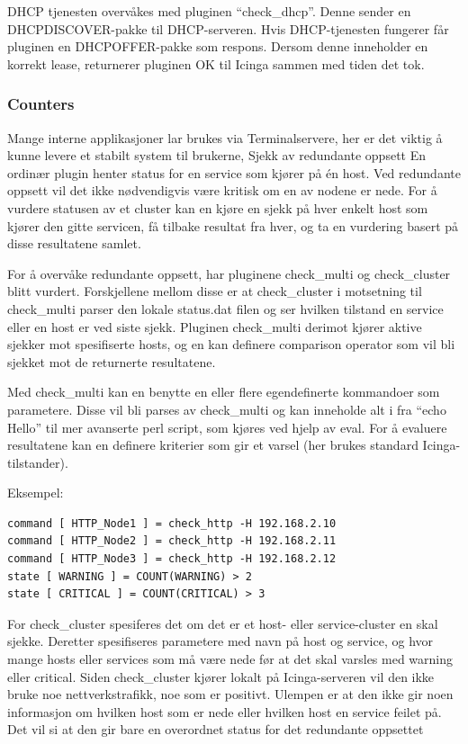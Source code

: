 DHCP tjenesten overvåkes med pluginen “check\_dhcp”. Denne sender en DHCPDISCOVER-pakke til DHCP-serveren. Hvis DHCP-tjenesten fungerer får pluginen en DHCPOFFER-pakke som respons. Dersom denne inneholder en korrekt lease, returnerer pluginen OK til Icinga sammen med tiden det tok.

\subsubsection{Counters}
Mange interne applikasjoner lar brukes via Terminalservere, her er det viktig å kunne levere et stabilt system til brukerne, 
Sjekk av redundante oppsett
En ordinær plugin henter status for en service som kjører på én host. Ved redundante oppsett vil det ikke nødvendigvis være kritisk om en av nodene er nede. For å vurdere statusen av et cluster kan en kjøre en sjekk på hver enkelt host som kjører den gitte servicen, få tilbake resultat fra hver, og ta en vurdering basert på disse resultatene samlet.

For å overvåke redundante oppsett, har pluginene check\_multi og check\_cluster blitt vurdert.  Forskjellene mellom disse er at check\_cluster i motsetning til check\_multi parser den lokale status.dat filen og ser hvilken tilstand en service eller en host er ved siste sjekk. Pluginen check\_multi derimot kjører aktive sjekker mot spesifiserte hosts, og en kan definere comparison operator som vil bli sjekket mot de returnerte resultatene.

Med check\_multi kan en benytte en eller flere egendefinerte kommandoer som parametere. Disse vil bli parses av check\_multi og kan inneholde alt i fra “echo Hello” til mer avanserte perl script, som kjøres ved hjelp av eval. For å evaluere resultatene kan en definere kriterier som gir et varsel (her brukes standard Icinga-tilstander). 

Eksempel:
\begin{lstlisting}
command [ HTTP_Node1 ] = check_http -H 192.168.2.10
command [ HTTP_Node2 ] = check_http -H 192.168.2.11
command [ HTTP_Node3 ] = check_http -H 192.168.2.12
state [ WARNING ] = COUNT(WARNING) > 2
state [ CRITICAL ] = COUNT(CRITICAL) > 3
\end{lstlisting}
For check\_cluster spesiferes det om det er et host- eller service-cluster en skal sjekke. Deretter spesifiseres parametere med navn på host og service, og hvor mange hosts eller services som må være nede før at det skal varsles med warning eller critical. Siden check\_cluster kjører lokalt på Icinga-serveren vil den ikke bruke noe nettverkstrafikk, noe som er positivt. Ulempen er at den ikke gir noen informasjon om hvilken host som er nede eller hvilken host en service feilet på. Det vil si at den gir bare en overordnet status for det redundante oppsettet     

